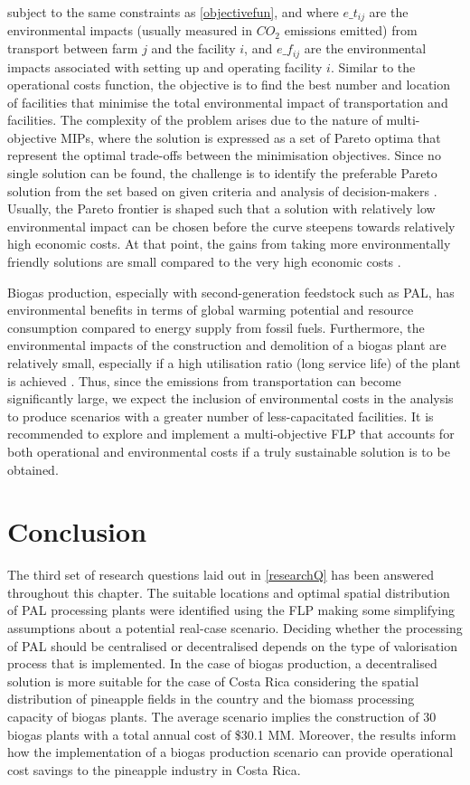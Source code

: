 subject to the same constraints as \cref{objectivefun}, and where $e\_t_{ij}$ are the environmental impacts (usually measured in $CO_2$ emissions emitted) from transport between farm $j$ and the facility $i$, and $e\_f_{ij}$ are the environmental impacts associated with setting up and operating facility $i$. Similar to the operational costs function, the objective is to find the best number and location of facilities that minimise the total environmental impact of transportation and facilities. The complexity of the problem arises due to the nature of multi-objective MIPs, where the solution is expressed as a set of Pareto optima that represent the optimal trade-offs between the minimisation objectives. Since no single solution can be found, the challenge is to identify the preferable Pareto solution from the set based on given criteria and analysis of decision-makers \cite{limleamthong2018combined}. Usually, the Pareto frontier is shaped such that a solution with relatively low environmental impact can be chosen before the curve steepens towards relatively high economic costs. At that point, the gains from taking more environmentally friendly solutions are small compared to the very high economic costs \cite{harris2009multi}.

Biogas production, especially with second-generation feedstock such as PAL, has environmental benefits in terms of global warming potential and resource consumption compared to energy supply from fossil fuels. Furthermore, the environmental impacts of the construction and demolition of a biogas plant are relatively small, especially if a high utilisation ratio (long service life) of the plant is achieved \citep{hijazi2016review}. Thus, since the emissions from transportation can become significantly large, we expect the inclusion of environmental costs in the analysis to produce scenarios with a greater number of less-capacitated facilities. It is recommended to explore and implement a multi-objective FLP that accounts for both operational and environmental costs if a truly sustainable solution is to be obtained. 

\section{Conclusion}

The third set of research questions laid out in \cref{researchQ} has been answered throughout this chapter. The suitable locations and optimal spatial distribution of PAL processing plants were identified using the FLP making some simplifying assumptions about a potential real-case scenario. Deciding whether the processing of PAL should be centralised or decentralised depends on the type of valorisation process that is implemented. In the case of biogas production, a decentralised solution is more suitable for the case of Costa Rica considering the spatial distribution of pineapple fields in the country and the biomass processing capacity of biogas plants. The average scenario implies the construction of 30 biogas plants with a total annual cost of \$30.1 MM. Moreover, the results inform how the implementation of a biogas production scenario can provide operational cost savings to the pineapple industry in Costa Rica. 

